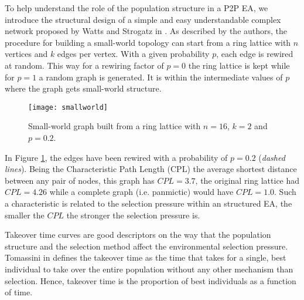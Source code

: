 

To help understand the role of the population structure in a P2P EA, we introduce the structural design of a simple and easy understandable complex network proposed by Watts and Strogatz in \cite{wattsstrogatz}. As described by the authors, the procedure for building a small-world topology can start from a ring lattice with $n$ vertices and $k$ edges per vertex. With a given probability $p$, each edge is rewired at random. This way for a rewiring factor of
$p=0$ the ring lattice is kept while for $p=1$ a random graph is generated. It is within the intermediate values of $p$ where the graph gets small-world structure.



\begin{figure}[htbp]
\begin{center}
\texttt{[image: smallworld]}
\end{center}
\vspace{-2ex}
\caption{Small-world graph built from a ring lattice with $n=16$, $k=2$ and $p=0.2$.}
\label{fig:small-world}
\end{figure}


In Figure \ref{fig:small-world}, the edges have been rewired with a probability of $p=0.2$ ({\em dashed lines}). Being the {\sf Characteristic Path Length (CPL)} the average shortest distance between any pair of nodes, this graph has $CPL=3.7$, the original ring lattice had $CPL=4.26$ while a complete graph (i.e. panmictic) would have $CPL=1.0$. Such a characteristic is related to the selection pressure within an structured EA, the smaller the $CPL$ the stronger the selection pressure is.

Takeover time curves are good descriptors on the way that the population structure and the selection method affect the environmental selection pressure. Tomassini in \cite{tomassini} defines the takeover time as the time that takes for a single, best individual to take over the entire population without any other mechanism than selection. Hence, takeover time is the proportion of best individuals as a function of time. 


